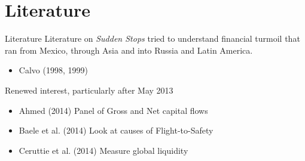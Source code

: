 \documentclass[14pt,xcolor=pdftex,dvipsnames,table]{beamer}
\begin{document}
\section{Literature}
\begin{frame}{Literature}
Literature on \emph{Sudden Stops} tried to understand financial turmoil that ran from Mexico, through Asia and into Russia and Latin America.
\pause
\begin{itemize}[<+-| alert@+>]
\item Calvo (1998, 1999)
\end{itemize}
\pause
Renewed interest, particularly after May 2013
\begin{itemize}
\item Ahmed (2014) Panel of Gross and Net capital flows
\item Baele et al. (2014) Look at causes of Flight-to-Safety  
\item Ceruttie et al. (2014) Measure global liquidity 
\end{itemize}
\end{frame}
\end{document}

